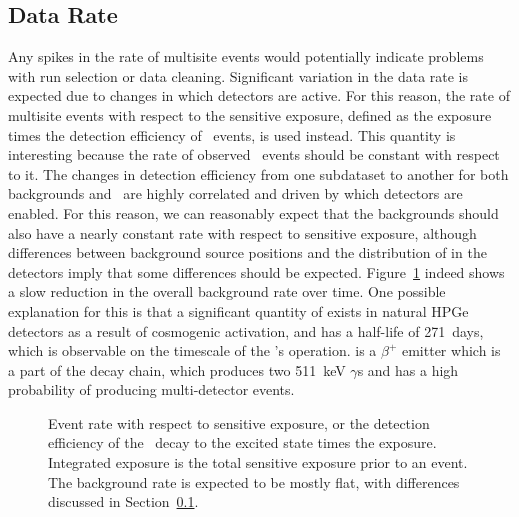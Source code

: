 \documentclass[/main.tex]{subfiles}
\begin{document}
\subsection{Data Rate} \label{sec:ratecheck}
Any spikes in the rate of multisite events would potentially indicate problems with run selection or data cleaning.
Significant variation in the data rate is expected due to changes in which detectors are active.
For this reason, the rate of multisite events with respect to the sensitive exposure, defined as the exposure times the detection efficiency of \bbes\ events, is used instead.
This quantity is interesting because the rate of observed \bbes\ events should be constant with respect to it.
The changes in detection efficiency from one subdataset to another for both backgrounds and \bbes\ are highly correlated and driven by which detectors are enabled.
For this reason, we can reasonably expect that the backgrounds should also have a nearly constant rate with respect to sensitive exposure, although differences between background source positions and the distribution of  in the detectors imply that some differences should be expected.
Figure~\ref{fig:eventrate} indeed shows a slow reduction in the overall background rate over time.
One possible explanation for this is that a significant quantity of  exists in natural HPGe detectors as a result of cosmogenic activation, and has a half-life of 271~days, which is observable on the timescale of the \MJD's operation.
 is a $\beta^+$ emitter which is a part of the  decay chain, which produces two 511~keV $\gamma$s and has a high probability of producing multi-detector events.
\begin{figure}[ht]
  \centering
  \caption[Event rate in both modules with respect to sensitive exposure]{\label{fig:eventrate}
    Event rate with respect to sensitive exposure, or the detection efficiency of the \tnbb\ decay to the  excited state times the exposure. Integrated exposure is the total sensitive exposure prior to an event. The background rate is expected to be mostly flat, with differences discussed in Section~\ref{sec:ratecheck}.
  }
\end{figure}
\end{document}
